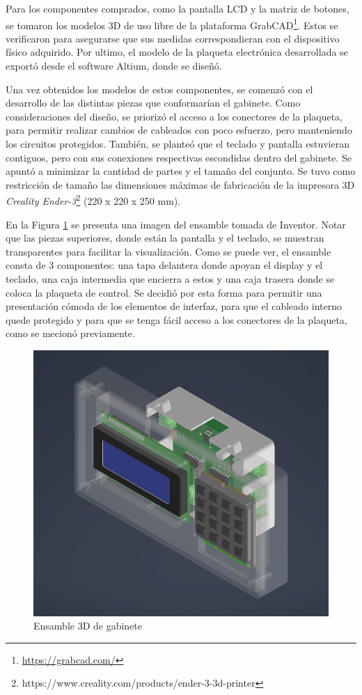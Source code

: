 Para los componentes comprados, como la pantalla LCD y la matriz de botones, se tomaron los modelos 3D de uso libre de la plataforma GrabCAD\footnote{\url{https://grabcad.com/}}. Estos se verificaron para asegurarse que sus medidas correspondieran con el dispositivo físico adquirido. Por ultimo, el modelo de la plaqueta electrónica desarrollada se exportó desde el software Altium, donde se diseñó.

Una vez obtenidos los modelos de estos componentes, se comenzó con el desarrollo de las distintas piezas que conformarían el gabinete. Como consideraciones del diseño, se priorizó el acceso a los conectores de la plaqueta, para permitir realizar cambios de cableados con poco esfuerzo, pero manteniendo los circuitos protegidos. También, se planteó que el teclado y pantalla estuvieran contiguos, pero con sus conexiones respectivas escondidas dentro del gabinete. Se apuntó a minimizar la cantidad de partes y el tamaño del conjunto. Se tuvo como restricción de tamaño las dimensiones máximas de fabricación de la impresora 3D \textit{Creality Ender-3}\footnote{https://www.creality.com/products/ender-3-3d-printer} (220 x 220 x 250 mm).

En la Figura \ref{fig:ensamble} se presenta una imagen del ensamble tomada de Inventor. Notar que las piezas superiores, donde están la pantalla y el teclado, se muestran transparentes para facilitar la visualización. Como se puede ver, el ensamble consta de 3 componentes: una tapa delantera donde apoyan el display y el teclado, una caja intermedia que encierra a estos y una caja trasera donde se coloca la plaqueta de control. Se decidió por esta forma para permitir una presentación cómoda de los elementos de interfaz, para que el cableado interno quede protegido y para que se tenga fácil acceso a los conectores de la plaqueta, como se mecionó previamente.

\begin{figure}[htbp]
	\centering
	\includegraphics[scale=.6]{./Figures/asm_3d.JPG}
	\caption{Ensamble 3D de gabinete}
	\label{fig:ensamble}
\end{figure}

